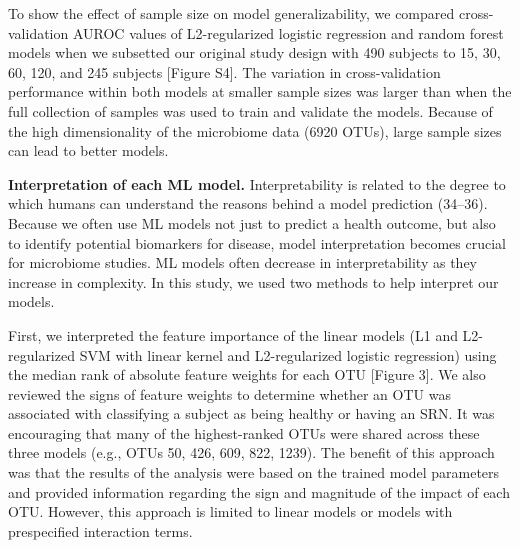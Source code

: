 \documentclass[11pt,]{article}
\begin{document}
To show the effect of sample size on model generalizability, we compared
cross-validation AUROC values of L2-regularized logistic regression and
random forest models when we subsetted our original study design with
490 subjects to 15, 30, 60, 120, and 245 subjects {[}Figure S4{]}. The
variation in cross-validation performance within both models at smaller
sample sizes was larger than when the full collection of samples was
used to train and validate the models. Because of the high
dimensionality of the microbiome data (6920 OTUs), large sample sizes
can lead to better models.

\textbf{Interpretation of each ML model.} Interpretability is related to
the degree to which humans can understand the reasons behind a model
prediction (34--36). Because we often use ML models not just to predict
a health outcome, but also to identify potential biomarkers for disease,
model interpretation becomes crucial for microbiome studies. ML models
often decrease in interpretability as they increase in complexity. In
this study, we used two methods to help interpret our models.

First, we interpreted the feature importance of the linear models (L1
and L2-regularized SVM with linear kernel and L2-regularized logistic
regression) using the median rank of absolute feature weights for each
OTU {[}Figure 3{]}. We also reviewed the signs of feature weights to
determine whether an OTU was associated with classifying a subject as
being healthy or having an SRN. It was encouraging that many of the
highest-ranked OTUs were shared across these three models (e.g., OTUs
50, 426, 609, 822, 1239). The benefit of this approach was that the
results of the analysis were based on the trained model parameters and
provided information regarding the sign and magnitude of the impact of
each OTU. However, this approach is limited to linear models or models
with prespecified interaction terms.
\end{document}
